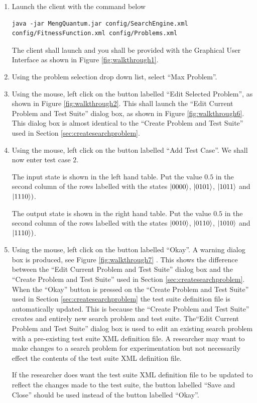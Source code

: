 \begin{enumerate}
 \item Launch the client with the command below
\begin{lstlisting}
java -jar MengQuantum.jar config/SearchEngine.xml config/FitnessFunction.xml config/Problems.xml
\end{lstlisting}
The client shall launch and you shall be provided with the Graphical User Interface as shown in Figure \ref{fig:walkthrough1}.

\item Using the problem selection drop down list, select ``Max Problem''.

\item Using the mouse, left click on the button labelled ``Edit Selected Problem'', as shown in Figure \ref{fig:walkthrough2}.
This shall launch the ``Edit Current Problem and Test Suite'' dialog box, as shown in Figure \ref{fig:walkthrough6}.
This dialog box is almost identical to the ``Create Problem and Test Suite'' used in Section \ref{sec:createsearchproblem}.

\item Using the mouse, left click on the button labelled ``Add Test Case''.
We shall now enter test case $2$.

The input state is shown in the left hand table.
Put the value $0.5$ in the second column of the rows labelled with the states $\left\vert{0000}\right\rangle$, $\left\vert{0101}\right\rangle$, $\left\vert{1011}\right\rangle$ and $\left\vert{1110}\right\rangle)$.

The output state is shown in the right hand table.
Put the value $0.5$ in the second column of the rows labelled with the states $\left\vert{0010}\right\rangle$, $\left\vert{0110}\right\rangle$, $\left\vert{1010}\right\rangle$ and $\left\vert{1110}\right\rangle)$.

\item Using the mouse, left click on the button labelled ``Okay''.
A warning dialog box is produced, see Figure \ref{fig:walkthrough7} .
This shows the difference between the ``Edit Current Problem and Test Suite'' dialog box and the ``Create Problem and Test Suite'' used in Section \ref{sec:createsearchproblem}.
When the ``Okay'' button is pressed on the ``Create Problem and Test Suite'' used in Section \ref{sec:createsearchproblem} the test suite definition file is automatically updated.
This is because the ``Create Problem and Test Suite'' creates and entirely new search problem and test suite.
The``Edit Current Problem and Test Suite'' dialog box is used to edit an existing search problem with a pre-existing test suite XML definition file.
A researcher may want to make changes to a search problem for experimentation but not necessarily effect the contents of the test suite XML definition file.

If the researcher does want the test suite XML definition file to be updated to reflect the changes made to the test suite, the button labelled ``Save and Close'' should be used instead of the button labelled ``Okay''.

\end{enumerate}

